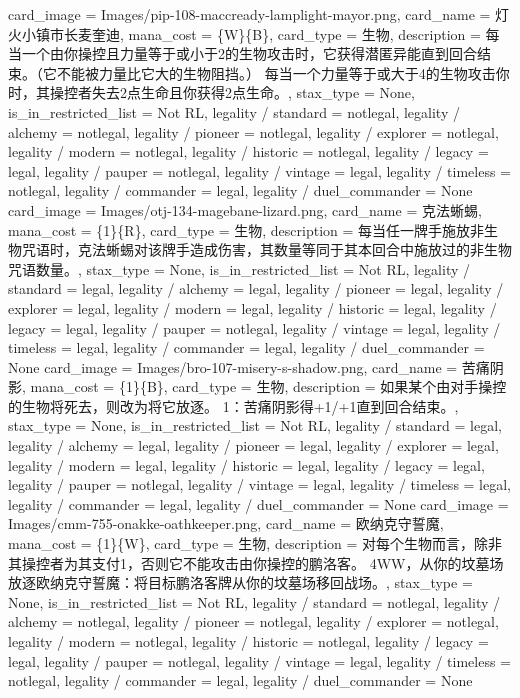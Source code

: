 \documentclass[lang = cn, color = black, 10pt]{AllThatStax}
\begin{document}
\card
{
	card_image = Images/pip-108-maccready-lamplight-mayor.png,
	card_name = 灯火小镇市长麦奎迪,
	mana_cost = \{W\}\{B\},
	card_type = 生物,
	description = 每当一个由你操控且力量等于或小于2的生物攻击时，它获得潜匿异能直到回合结束。（它不能被力量比它大的生物阻挡。）
	每当一个力量等于或大于4的生物攻击你时，其操控者失去2点生命且你获得2点生命。,
	stax_type = None,
	is_in_restricted_list = Not RL,
	legality / standard = notlegal,
	legality / alchemy = notlegal,
	legality / pioneer = notlegal,
	legality / explorer = notlegal,
	legality / modern = notlegal,
	legality / historic = notlegal,
	legality / legacy = legal,
	legality / pauper = notlegal,
	legality / vintage = legal,
	legality / timeless = notlegal,
	legality / commander = legal,
	legality / duel_commander = None
}
\card
{
	card_image = Images/otj-134-magebane-lizard.png,
	card_name = 克法蜥蜴,
	mana_cost = \{1\}\{R\},
	card_type = 生物,
	description = 每当任一牌手施放非生物咒语时，克法蜥蜴对该牌手造成伤害，其数量等同于其本回合中施放过的非生物咒语数量。,
	stax_type = None,
	is_in_restricted_list = Not RL,
	legality / standard = legal,
	legality / alchemy = legal,
	legality / pioneer = legal,
	legality / explorer = legal,
	legality / modern = legal,
	legality / historic = legal,
	legality / legacy = legal,
	legality / pauper = notlegal,
	legality / vintage = legal,
	legality / timeless = legal,
	legality / commander = legal,
	legality / duel_commander = None
}
\card
{
	card_image = Images/bro-107-misery-s-shadow.png,
	card_name = 苦痛阴影,
	mana_cost = \{1\}\{B\},
	card_type = 生物,
	description = 如果某个由对手操控的生物将死去，则改为将它放逐。
	{1}：苦痛阴影得+1/+1直到回合结束。,
	stax_type = None,
	is_in_restricted_list = Not RL,
	legality / standard = legal,
	legality / alchemy = legal,
	legality / pioneer = legal,
	legality / explorer = legal,
	legality / modern = legal,
	legality / historic = legal,
	legality / legacy = legal,
	legality / pauper = notlegal,
	legality / vintage = legal,
	legality / timeless = legal,
	legality / commander = legal,
	legality / duel_commander = None
}
\card
{
	card_image = Images/cmm-755-onakke-oathkeeper.png,
	card_name = 欧纳克守誓魔,
	mana_cost = \{1\}\{W\},
	card_type = 生物,
	description = 对每个生物而言，除非其操控者为其支付{1}，否则它不能攻击由你操控的鹏洛客。
	{4}{W}{W}，从你的坟墓场放逐欧纳克守誓魔：将目标鹏洛客牌从你的坟墓场移回战场。,
	stax_type = None,
	is_in_restricted_list = Not RL,
	legality / standard = notlegal,
	legality / alchemy = notlegal,
	legality / pioneer = notlegal,
	legality / explorer = notlegal,
	legality / modern = notlegal,
	legality / historic = notlegal,
	legality / legacy = legal,
	legality / pauper = notlegal,
	legality / vintage = legal,
	legality / timeless = notlegal,
	legality / commander = legal,
	legality / duel_commander = None
}
\end{document}
